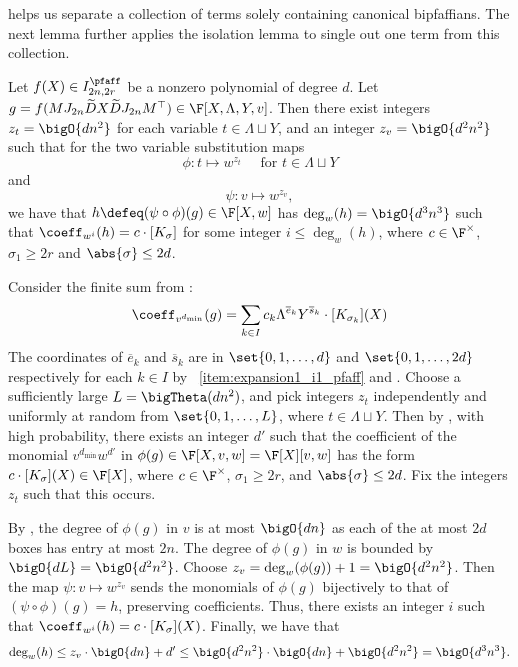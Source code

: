 \documentclass[letterpaper, 11pt]{amsart}
\begin{document}
 helps us separate a collection of terms solely containing canonical bipfaffians.
The next lemma further applies the isolation lemma to single out one term from this collection.

\begin{lem}\label{lem:univariate_pfaff}
Let $f(X) \in I^{\pfaff}_{2n, 2r}$ be a nonzero polynomial of degree $d$.
Let $g = f(M J_{2n} \widetilde{D} X \widetilde{D} J_{2n} M^\top) \in \F[X, \Lambda, Y, v]$.
Then there exist integers $z_t = \bigO{dn^2}$ for each variable $t\in \Lambda \sqcup Y$, and an integer $z_v = \bigO{d^2 n^2}$ such that for the two variable substitution maps 
\[
    \phi\colon t \mapsto w^{z_t} \quad\text{ for } t\in \Lambda \sqcup Y
\]
and
\[
    \psi\colon v \mapsto w^{z_v},
\]
we have that $h \defeq (\psi\circ\phi)(g)\in\F[X,w]$ has $\deg_w(h) = \bigO{d^3 n^3}$ such that $\coeff_{w^i}(h) = c\cdot [K_\sigma]$ for some integer $i \leq \deg_w(h)$, where $c\in\F^\times$, $\sigma_1\geq 2r$ and $\abs{\sigma}\leq 2d$.
\end{lem}
\begin{pf}
Consider the finite sum from :
\[
    \coeff_{v^{d_{\min}}}(g) = \sum_{k\in I} c_k \Lambda^{\overline{e}_k} Y^{\overline{s}_k} \cdot [K_{\sigma_k}](X)
\]
The coordinates of $\overline{e}_k$ and $\overline{s}_k$ are in $\set{0,1,\dots,d}$ and $\set{0, 1, \dots, 2d}$ respectively for each $k \in I$ by ~\eqref{item:expansion1_i1_pfaff} and .
Choose a sufficiently large $L = \bigTheta(dn^2)$, and pick integers $z_t$ independently and uniformly at random from $\set{0, 1, \dots, L}$, where $t\in \Lambda \sqcup Y$.
Then by , with high probability, there exists an integer $d'$ such that the coefficient of the monomial $v^{d_{\min}}w^{d'}$ in $\phi(g) \in \F[X,v,w]=\F[X][v,w]$ has the form $c\cdot [K_\sigma](X) \in \F[X]$, where $c\in\F^\times$, $\sigma_1 \geq 2r$, and $\abs{\sigma} \leq 2d$.
Fix the integers $z_t$ such that this occurs.

By , the degree of $\phi(g)$ in $v$ is at most $\bigO{dn}$ as each of the at most $2d$ boxes has entry at most $2n$.
The degree of $\phi(g)$ in $w$ is bounded by $\bigO{dL} = \bigO{d^2 n^2}$.
Choose $z_v=\deg_w(\phi(g))+ 1 = \bigO{d^2 n^2}$.
Then the map $\psi\colon v\mapsto w^{z_v}$ sends the monomials of $\phi(g)$ bijectively to that of $(\psi\circ\phi)(g)=h$, preserving coefficients.
Thus, there exists an integer $i$ such that $\coeff_{w^i}(h) = c\cdot [K_\sigma](X)$.
Finally, we have that
\[
    \deg_w(h) \leq z_v \cdot \bigO{dn} + d' \leq \bigO{d^2 n^2} \cdot \bigO{dn} + \bigO{d^2 n^2} = \bigO{d^3 n^3}.
\]
\end{pf}
\end{document}
